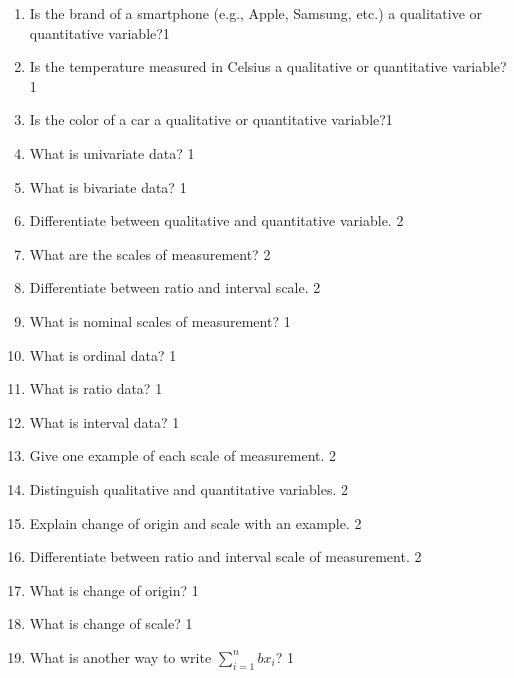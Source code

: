 \documentclass[a4paper,oneside]{book}
\begin{document}
\begin{enumerate}
\item Is the brand of a smartphone (e.g., Apple, Samsung, etc.) 
a qualitative or quantitative variable?\hfill 1

\item Is the temperature measured in Celsius a qualitative or quantitative variable?\hfill 1

\item Is the color of a car a qualitative or quantitative variable?\hfill 1

\item What is univariate data? \hfill 1

\item What is bivariate data? \hfill 1

\item Differentiate between qualitative and quantitative variable. \hfill 2

\item What are the scales of measurement? \hfill 2

\item Differentiate between ratio and interval scale. \hfill 2

\item What is nominal scales of measurement? \hfill 1

\item What is ordinal data? \hfill 1

\item What is ratio data? \hfill 1

\item What is interval data? \hfill 1

\item Give one example of each scale of measurement. \hfill 2
\item Distinguish qualitative and quantitative variables. \hfill 2 

\item Explain change of origin and scale with an example. \hfill 2

\item Differentiate between ratio and interval scale of measurement. \hfill 2

\item What is change of origin? \hfill 1

\item What is change of scale? \hfill 1

\item What is another way to write $\displaystyle \sum_{i=1}^n bx_i$?  \hfill 1


\end{enumerate}
\end{document}
